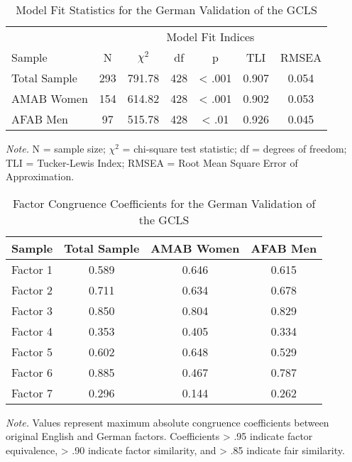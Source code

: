 \documentclass[12pt,a4paper]{article}
\begin{document}
\begin{table}[htbp]
\centering
\caption{Model Fit Statistics for the German Validation of the GCLS}
\begin{tabular}{lcccccc}
\toprule
\multicolumn{1}{c}{} & \multicolumn{6}{c}{Model Fit Indices} \\
\cmidrule(l{3pt}r{3pt}){2-7}
Sample & N & $\chi^2$ & df & p & TLI & RMSEA\\
\midrule
Total Sample & 293 & 791.78 & 428 & < .001 & 0.907 & 0.054\\
AMAB Women & 154 & 614.82 & 428 & < .001 & 0.902 & 0.053\\
AFAB Men & 97 & 515.78 & 428 & < .01 & 0.926 & 0.045\\
\bottomrule
\end{tabular}
\begin{tablenotes}
\small
\item \textit{Note.} N = sample size; $\chi^2$ = chi-square test statistic; df = degrees of freedom; TLI = Tucker-Lewis Index; RMSEA = Root Mean Square Error of Approximation.
\end{tablenotes}
\end{table}

\begin{table}[htbp]
\centering
\caption{Factor Congruence Coefficients for the German Validation of the GCLS}
\begin{tabular}{lccc}
\toprule
Sample & Total Sample & AMAB Women & AFAB Men\\
\midrule
Factor 1 & 0.589 & 0.646 & 0.615\\
Factor 2 & 0.711 & 0.634 & 0.678\\
Factor 3 & 0.850 & 0.804 & 0.829\\
Factor 4 & 0.353 & 0.405 & 0.334\\
Factor 5 & 0.602 & 0.648 & 0.529\\
Factor 6 & 0.885 & 0.467 & 0.787\\
Factor 7 & 0.296 & 0.144 & 0.262\\
\bottomrule
\end{tabular}
\begin{tablenotes}
\small
\item \textit{Note.} Values represent maximum absolute congruence coefficients between original English and German factors. Coefficients > .95 indicate factor equivalence, > .90 indicate factor similarity, and > .85 indicate fair similarity.
\end{tablenotes}
\end{table}
\end{document}
